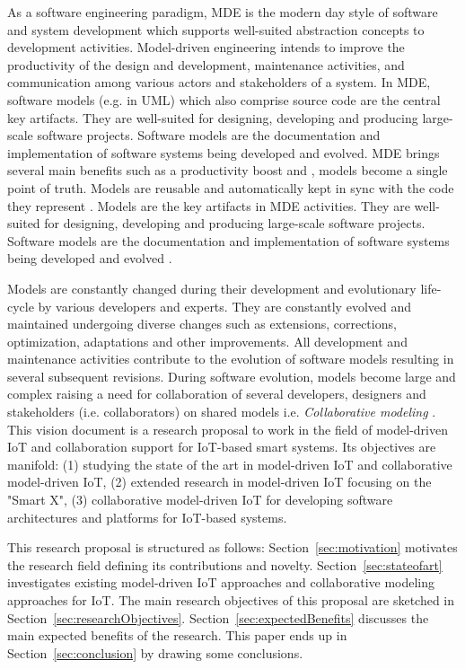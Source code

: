 As a software engineering paradigm, MDE is the modern day style of software and system development which supports well-suited abstraction concepts to development activities. Model-driven engineering intends to improve the productivity of the design and development, maintenance activities, and communication among various actors and stakeholders of a system. In MDE, software models (e.g. in UML) which also comprise source code are the central key artifacts. They are well-suited for designing, developing and producing large-scale software projects. Software models are the documentation and implementation of software systems being developed and evolved. MDE brings several main benefits such as a productivity boost and , models become a single point of truth. Models are reusable and automatically kept in sync with the code they represent \cite{Fleurey+2011}. Models are the key artifacts in MDE activities. They are well-suited for designing, developing and producing large-scale software projects. Software models are the documentation and implementation of software systems being developed and evolved \cite{Kleppe+2003}.

Models are constantly changed during their development and evolutionary life-cycle by various developers and experts. They are constantly evolved and maintained undergoing diverse changes such as extensions, corrections, optimization, adaptations and other improvements. All development and maintenance activities contribute to the evolution of software models resulting in several subsequent revisions. During software evolution, models become large and complex raising a need for collaboration of several developers, designers and stakeholders (i.e. collaborators) on shared models i.e. \textit{Collaborative modeling} \cite{Kuryazov+2018}. This vision document is a research proposal to work in the field of model-driven IoT and collaboration support for IoT-based smart systems. Its objectives are manifold: (1) studying the state of the art in model-driven IoT and collaborative model-driven IoT, (2) extended research in model-driven IoT focusing on the "Smart X", (3) collaborative model-driven IoT for developing software architectures and platforms for IoT-based systems.

This research proposal is structured as follows: Section~\ref{sec:motivation} motivates the research field defining its contributions and novelty. Section~\ref{sec:stateofart} investigates existing model-driven IoT approaches and collaborative modeling approaches for IoT. The main research objectives of this proposal are sketched in Section~\ref{sec:researchObjectives}. Section~\ref{sec:expectedBenefits} discusses the main expected benefits of the research. This paper ends up in Section~\ref{sec:conclusion} by drawing some conclusions.